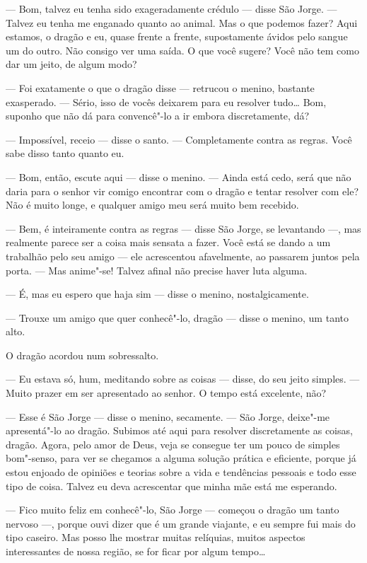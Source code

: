 --- Bom, talvez eu tenha sido exageradamente crédulo --- disse São Jorge.
--- Talvez eu tenha me enganado quanto ao animal. Mas o que podemos
fazer? Aqui estamos, o dragão e eu, quase frente a frente,
supostamente ávidos pelo sangue um do outro. Não consigo ver uma
saída. O que você sugere? Você não tem como dar um jeito, de algum
modo?

--- Foi exatamente o que o dragão disse --- retrucou o menino, bastante
exasperado. --- Sério, isso de vocês deixarem para eu resolver tudo\ldots{}
Bom, suponho que não dá para convencê"-lo a ir embora discretamente,
dá?

--- Impossível, receio --- disse o santo. --- Completamente contra as
regras. Você sabe disso tanto quanto eu. 

--- Bom, então, escute aqui --- disse o menino. --- Ainda está cedo, será
que não daria para o senhor vir comigo encontrar com o dragão e
tentar resolver com ele? Não é muito longe, e qualquer amigo meu será
muito bem recebido. 

--- Bem, é inteiramente contra as regras --- disse São Jorge, se
levantando ---, mas realmente parece ser a coisa mais sensata a fazer.
Você está se dando a um trabalhão pelo seu amigo --- ele
acrescentou afavelmente, ao passarem juntos pela porta. --- Mas
anime"-se! Talvez afinal não precise haver luta alguma.

--- É, mas eu espero que haja sim --- disse o menino, nostalgicamente. 


--- Trouxe um amigo que quer conhecê"-lo, dragão --- disse o menino, um
tanto alto.

O dragão acordou num sobressalto.

--- Eu estava só, hum, meditando sobre as coisas --- disse, do seu jeito
simples. --- Muito prazer em ser apresentado ao senhor. O tempo está
excelente, não?

--- Esse é São Jorge --- disse o menino, secamente. --- São Jorge, deixe"-me
apresentá"-lo ao dragão. Subimos até aqui para resolver discretamente
as coisas, dragão. Agora, pelo amor de Deus, veja se consegue ter
um pouco de simples bom"-senso, para ver se chegamos a alguma solução
prática e eficiente, porque já estou enjoado de opiniões e teorias
sobre a vida e tendências pessoais e todo esse tipo de coisa. Talvez
eu deva acrescentar que minha mãe está me esperando.

--- Fico muito feliz em conhecê"-lo, São Jorge --- começou o dragão um
tanto nervoso ---, porque ouvi dizer que é um grande viajante, e eu
sempre fui mais do tipo caseiro. Mas posso lhe mostrar muitas
relíquias, muitos aspectos interessantes de nossa região, se for
ficar por algum tempo\ldots{}

